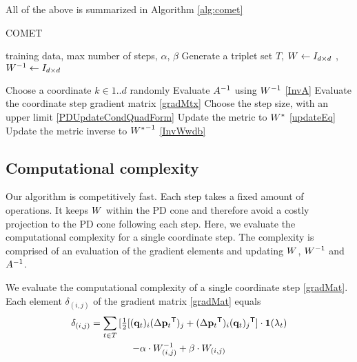 \documentclass{article}
\begin{document}

All of the above is summarized in Algorithm \ref{alg:comet}

\begin{algorithm}[tb]
   \caption{COMET}
   \label{alg:comet}
\begin{algorithmic}[1]
    training data, max number of steps, $\alpha$, $\beta$
   \STATE Generate a triplet set $T$, ${W}  \leftarrow I_{d \times d}$ , ${W}^{-1}  \leftarrow I_{d \times d}$

   \REPEAT 
   \STATE Choose a coordinate $k \in {1..d}$ randomly
   \STATE Evaluate ${A}^{-1}$ using ${W}^{-1}$ \eqref{InvA}
   \STATE Evaluate the coordinate step gradient matrix \eqref{gradMtx}
   \STATE Choose the step size, with an upper limit  \eqref{PDUpdateCondQuadForm}
   \STATE Update the metric to ${{W^*}}$ \eqref{updateEq}
   \STATE Update the metric inverse to ${{W^*}}^{-1}$ \eqref{InvWwdb}
\end{algorithmic}
\end{algorithm}

\subsection{Computational complexity}
Our algorithm is competitively fast. Each step takes a fixed amount of operations. It keeps ${W}$ within the PD cone and therefore avoid a costly projection to the PD cone following each step. Here, we evaluate the computational complexity for a single coordinate step. The complexity is comprised of an evaluation of the gradient elements and updating ${W}$, ${W}^{-1}$ and ${A}^{-1}$.

We evaluate the computational complexity of a single coordinate step \eqref{gradMat}. Each element $\delta_{(i,j)}$ of the gradient matrix \eqref{gradMat} equals
\begin{multline}
\delta_{(i,j)} = \sum\limits_{t\in T}{ [\tfrac{1}{2}[(\mathbf{q}_{t})_i(\Delta\mathbf{p}_{t}{}^\mathsf{T})_j + (\Delta\mathbf{p}_{t}{}^\mathsf{T})_i(\mathbf{q}_{t})_j{}^\mathsf{T}] } \cdot \textbf{1}(\lambda_t)  \\ 
 - \alpha \cdot {W}^{-1}_{(i,j)} + \beta \cdot {W}_{(i,j)}
\label{gradMatElem}
\end{multline}
\end{document}
